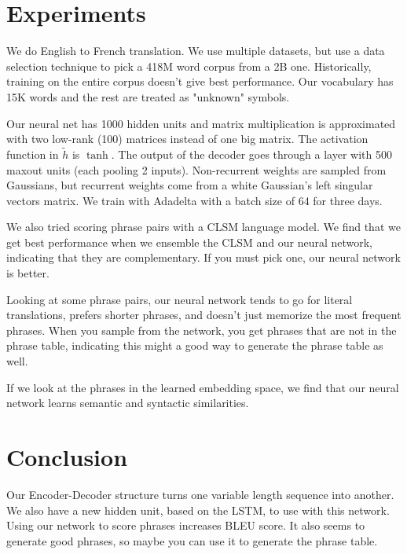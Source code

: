 \documentclass[a4paper]{article}
\begin{document}
\section{Experiments}
We do English to French translation. We use multiple datasets, but use a
data selection technique to pick a 418M word corpus from a 2B one. Historically,
training on the entire corpus doesn't give best performance. Our vocabulary has
15K words and the rest are treated as "unknown" symbols.

Our neural net has 1000 hidden units and matrix multiplication is approximated
with two low-rank (100) matrices instead of one big matrix. The activation
function in $\tilde{h}$ is $\tanh$. The output of the decoder goes through
a layer with 500 maxout units (each pooling 2 inputs). Non-recurrent weights
are sampled from Gaussians, but recurrent weights come from a white Gaussian's
left singular vectors matrix. We train with Adadelta with a batch size of 64
for three days.

We also tried scoring phrase pairs with a CLSM language model. We find that
we get best performance when we ensemble the CLSM and our neural network,
indicating that they are complementary. If you must pick one, our neural
network is better.

Looking at some phrase pairs, our neural network tends to go for literal
translations, prefers shorter phrases, and doesn't just memorize the most
frequent phrases. When you sample from the network, you get phrases that
are not in the phrase table, indicating this might a good way to generate
the phrase table as well.

If we look at the phrases in the learned embedding space, we find that our
neural network learns semantic and syntactic similarities.

\section{Conclusion}
Our Encoder-Decoder structure turns one variable length sequence into another.
We also have a new hidden unit, based on the LSTM, to use with this
network. Using our network to score phrases increases BLEU score. It also
seems to generate good phrases, so maybe you can use it to generate the phrase
table.
\end{document}
